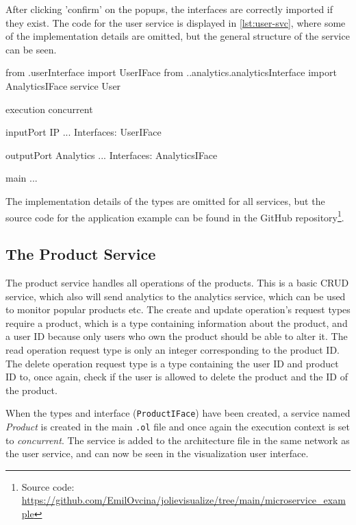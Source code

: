 After clicking 'confirm' on the popups, the interfaces are correctly imported if they exist. The code for the user service is displayed in
\cref{lst:user-svc}, where some of the implementation details are omitted, but the general structure of the service can be seen.

\begin{jolisting}[][caption={The user service after the ports have been created with omitted implementation details.}, label={lst:user-svc}]
from .userInterface import UserIFace
from ..analytics.analyticsInterface import AnalyticsIFace
service User {

    execution{ concurrent }

    inputPort IP {
        ...
        Interfaces: UserIFace
    }

    outputPort Analytics {
        ...
        Interfaces: AnalyticsIFace
    }

    main {
        ...
    }
}
\end{jolisting}

The implementation details of the types are omitted for all services, but the source code for the application example can be found in the GitHub repository\footnote{Source code: \url{https://github.com/EmilOvcina/jolievisualize/tree/main/microservice_example}}.

\subsection{The Product Service}
The product service handles all operations of the products. This is a basic CRUD service, which also will send analytics to the analytics service, which can be used to monitor popular products etc.
The create and update operation's request types require a product, which is a type containing information about the product, and a user ID because only users who own the product should be able to alter it.
The read operation request type is only an integer corresponding to the product ID. The delete operation request type is a type containing the user ID and product ID to, once again, check if the user is allowed to delete the product and the ID of the product.

When the types and interface (\texttt{ProductIFace}) have been created,
a service named \textit{Product} is created in the main \texttt{.ol} file and once again the execution context is set to \textit{concurrent}.
The service is added to the architecture file in the same network as the user service, and can now be seen in the visualization user interface.

